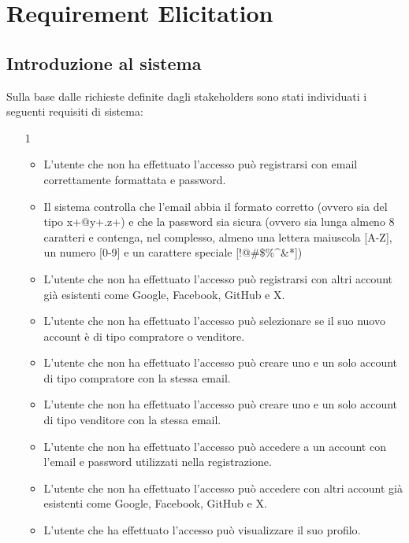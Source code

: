 
\chapter{Requirement Elicitation}
     \section{Introduzione al sistema} %
        Sulla base dalle richieste definite dagli stakeholders sono stati individuati i seguenti requisiti di sistema:
        
        \begin{itemize}
            \item[1]
                \begin{itemize}
                    \item L'utente che non ha effettuato l'accesso può registrarsi con email correttamente formattata e password.
                    \item Il sistema controlla che l'email abbia il formato corretto (ovvero sia del tipo x+@y+.z+) e che la password sia sicura (ovvero sia lunga almeno 8 caratteri e contenga, nel complesso, almeno una lettera maiuscola [A-Z], un numero [0-9] e un carattere speciale [!@\#\$\%\^{}\&*])
                    \item L'utente che non ha effettuato l'accesso può registrarsi con altri account già esistenti come Google, Facebook, GitHub e X.
                    \item L'utente che non ha effettuato l'accesso può selezionare se il suo nuovo account è di tipo compratore o venditore.
                    \item L'utente che non ha effettuato l'accesso può creare uno e un solo account di tipo compratore con la stessa email.
                    \item L'utente che non ha effettuato l'accesso può creare uno e un solo account di tipo venditore con la stessa email.
                    \item L'utente che non ha effettuato l'accesso può accedere a un account con l'email e password utilizzati nella registrazione.
                    \item L'utente che non ha effettuato l'accesso può accedere con altri account già esistenti come Google, Facebook, GitHub e X.
                    \item L'utente che ha effettuato l'accesso può visualizzare il suo profilo.

\end{itemize}
\end{itemize}
